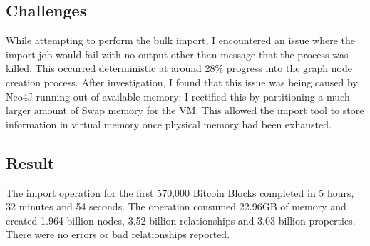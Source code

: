 \subsection{Challenges}
While attempting to perform the bulk import, I encountered an issue where the import job would fail with no output other than message that the process was killed. This occurred deterministic at around 28\% progress into the graph node creation process. After investigation, I found that this issue was being caused by Neo4J running out of available memory; I rectified this by partitioning a much larger amount of Swap memory for the VM. This allowed the import tool to store information in virtual memory once physical memory had been exhausted. 

\subsection{Result}
The import operation for the first 570,000 Bitcoin Blocks completed in 5 hours, 32 minutes and 54 seconds. The operation consumed 22.96GB of memory and created 1.964 billion nodes, 3.52 billion relationships and 3.03 billion properties. There were no errors or bad relationships reported. 